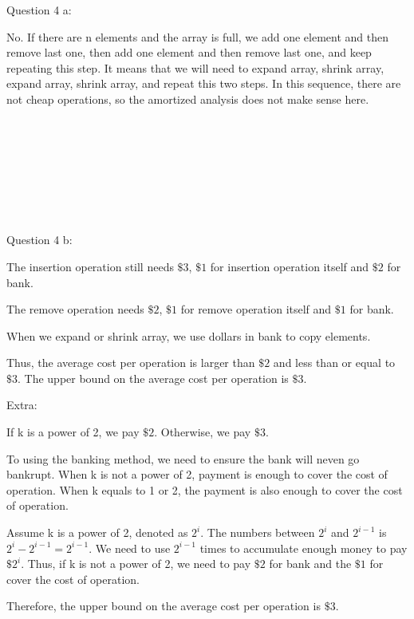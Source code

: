\documentclass[12pt]{article}
\begin{document}
\pagebreak
\noindent
\large Question 4 a: \vspace{5mm} \par
\normalsize 
No. If there are n elements and the array is full, we add one element and then remove last one, then add one element and then remove last one, and keep repeating this step. 
It means that we will need to expand array, shrink array, expand array, shrink array, and repeat this two steps.
In this sequence, there are not cheap operations, so the amortized analysis does not make sense here. 
\\
\\
\\
\\
\\
\\
\\
\\
\\
\noindent
\large Question 4 b: \vspace{5mm} \par
\normalsize 
The insertion operation still needs $\$3$, $\$1$ for insertion operation itself and $\$2$ for bank. \par
The remove operation needs $\$2$, $\$1$ for remove operation itself and $\$1$ for bank. \par
When we expand or shrink array, we use dollars in bank to copy elements. \par
Thus, the average cost per operation is larger than $\$2$ and less than or equal to $\$3$. The upper bound on the average cost per operation is $\$3$. 





\pagebreak
\noindent
\large Extra: \vspace{5mm} \par
\normalsize 
If k is a power of 2, we pay $\$2$. Otherwise, we pay $\$3$. \par
To using the banking method, we need to ensure the bank will neven go bankrupt. 
When k is not a power of 2, payment is enough to cover the cost of operation.
When k equals to 1 or 2, the payment is also enough to cover the cost of operation. \par
Assume k is a power of 2, denoted as $2^i$. The numbers between $2^i$ and $2^{i-1}$ is $2^{i} - 2^{i-1} = 2^{i-1}$.
We need to use $2^{i-1}$ times to accumulate enough money to pay $\$2^i$. 
Thus, if k is not a power of 2, we need to pay $\$2$ for bank and the $\$1$ for cover the cost of operation. \par
Therefore, the upper bound on the average cost per operation is $\$3$. 
\end{document}
